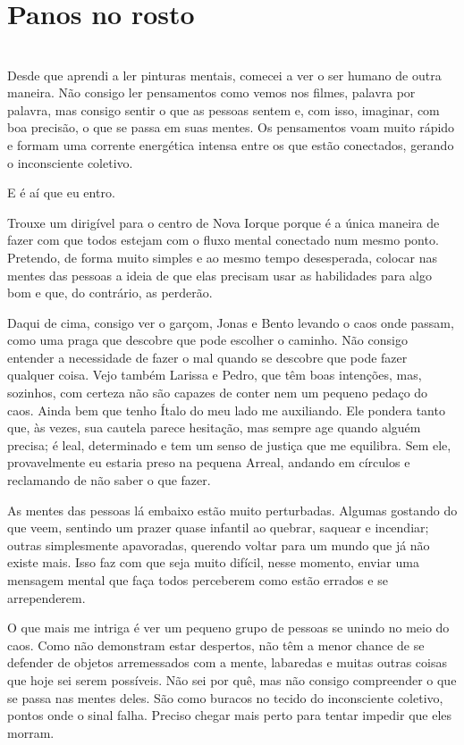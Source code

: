 \newpage
\ifdefined\useChapters
\chapter{Panos no rosto}
\else
\chapter{}
\fi

Desde que aprendi a ler pinturas mentais, comecei a ver o ser humano de outra maneira. Não consigo ler pensamentos como vemos nos filmes, palavra por palavra, mas consigo sentir o que as pessoas sentem e, com isso, imaginar, com boa precisão, o que se passa em suas mentes. Os pensamentos voam muito rápido e formam uma corrente energética intensa entre os que estão conectados, gerando o inconsciente coletivo.

E é aí que eu entro.

Trouxe um dirigível para o centro de Nova Iorque porque é a única maneira de fazer com que todos estejam com o fluxo mental conectado num mesmo ponto. Pretendo, de forma muito simples e ao mesmo tempo desesperada, colocar nas mentes das pessoas a ideia de que elas precisam usar as habilidades para algo bom e que, do contrário, as perderão.

Daqui de cima, consigo ver o garçom, Jonas e Bento levando o caos onde passam, como uma praga que descobre que pode escolher o caminho. Não consigo entender a necessidade de fazer o mal quando se descobre que pode fazer qualquer coisa. Vejo também Larissa e Pedro, que têm boas intenções, mas, sozinhos, com certeza não são capazes de conter nem um pequeno pedaço do caos. Ainda bem que tenho Ítalo do meu lado me auxiliando. Ele pondera tanto que, às vezes, sua cautela parece hesitação, mas sempre age quando alguém precisa; é leal, determinado e tem um senso de justiça que me equilibra. Sem ele, provavelmente eu estaria preso na pequena Arreal, andando em círculos e reclamando de não saber o que fazer.

As mentes das pessoas lá embaixo estão muito perturbadas. Algumas gostando do que veem, sentindo um prazer quase infantil ao quebrar, saquear e incendiar; outras simplesmente apavoradas, querendo voltar para um mundo que já não existe mais. Isso faz com que seja muito difícil, nesse momento, enviar uma mensagem mental que faça todos perceberem como estão errados e se arrependerem.

O que mais me intriga é ver um pequeno grupo de pessoas se unindo no meio do caos. Como não demonstram estar despertos, não têm a menor chance de se defender de objetos arremessados com a mente, labaredas e muitas outras coisas que hoje sei serem possíveis. Não sei por quê, mas não consigo compreender o que se passa nas mentes deles. São como buracos no tecido do inconsciente coletivo, pontos onde o sinal falha. Preciso chegar mais perto para tentar impedir que eles morram.

